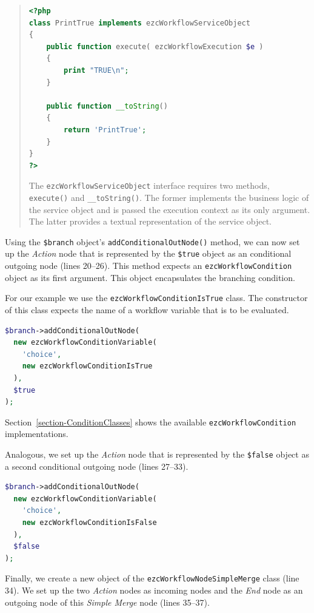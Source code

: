 \begin{quote}
\begin{lstlisting}[language=PHP,firstnumber=1,stepnumber=100]
<?php
class PrintTrue implements ezcWorkflowServiceObject
{
    public function execute( ezcWorkflowExecution $e )
    {
        print "TRUE\n";
    }

    public function __toString()
    {
        return 'PrintTrue';
    }
}
?>
\end{lstlisting}

The \texttt{ezcWorkflowServiceObject} interface requires two methods,
\texttt{execute()} and \texttt{\_\_toString()}. The former implements the
business logic of the service object and is passed the execution context as
its only argument. The latter provides a textual representation of the
service object.
\end{quote}

Using the \texttt{\$branch} object's \texttt{addConditionalOutNode()} method,
we can now set up the \emph{Action} node that is represented by the
\texttt{\$true} object as an conditional outgoing node (lines 20--26). This
method expects an \texttt{ezcWorkflowCondition} object as its first argument.
This object encapsulates the branching condition.

For our example we use the \texttt{ezcWorkflowConditionIsTrue} class. The
constructor of this class expects the name of a workflow variable that is to
be evaluated.

\begin{lstlisting}[language=PHP,firstnumber=20]
$branch->addConditionalOutNode(
  new ezcWorkflowConditionVariable(
    'choice',
    new ezcWorkflowConditionIsTrue
  ),
  $true
);
\end{lstlisting}

Section~\ref{section-ConditionClasses} shows the available
\texttt{ezcWorkflowCondition} implementations.

Analogous, we set up the \emph{Action} node that is represented by the
\texttt{\$false} object as a second conditional outgoing node (lines 27--33).

\begin{lstlisting}[language=PHP,firstnumber=27]
$branch->addConditionalOutNode(
  new ezcWorkflowConditionVariable(
    'choice',
    new ezcWorkflowConditionIsFalse
  ),
  $false
);
\end{lstlisting}

Finally, we create a new object of the \texttt{ezcWorkflowNodeSimpleMerge}
class (line 34). We set up the two \emph{Action} nodes as incoming nodes and the
\emph{End} node as an outgoing node of this \emph{Simple Merge} node (lines 35--37).

